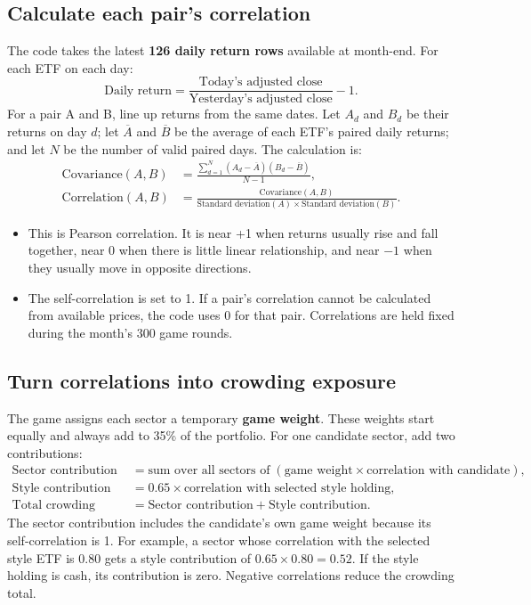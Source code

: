 \documentclass[11pt,letterpaper]{article}
\newcommand{\topic}[1]{\Needspace{5\baselineskip}\subsection*{#1}}
\newcommand{\word}[1]{\text{#1}}
\begin{document}
\topic{Calculate each pair's correlation}
The code takes the latest \textbf{126 daily return rows} available at month-end. For each ETF on each day:
\[
\word{Daily return}=\frac{\word{Today's adjusted close}}{\word{Yesterday's adjusted close}}-1.
\]
For a pair A and B, line up returns from the same dates. Let $A_d$ and $B_d$ be their returns on day $d$; let $\overline A$ and $\overline B$ be the average of each ETF's paired daily returns; and let $N$ be the number of valid paired days. The calculation is:
\[
\begin{aligned}
\word{Covariance}(A,B)&=\frac{\sum_{d=1}^{N}(A_d-\overline A)(B_d-\overline B)}{N-1},\\[4pt]
\word{Correlation}(A,B)&=\frac{\word{Covariance}(A,B)}
{\word{Standard deviation}(A)\times\word{Standard deviation}(B)}.
\end{aligned}
\]
\begin{itemize}
\item This is Pearson correlation. It is near +1 when returns usually rise and fall together, near 0 when there is little linear relationship, and near $-1$ when they usually move in opposite directions.
\item The self-correlation is set to 1. If a pair's correlation cannot be calculated from available prices, the code uses 0 for that pair. Correlations are held fixed during the month's 300 game rounds.
\end{itemize}

\topic{Turn correlations into crowding exposure}
The game assigns each sector a temporary \textbf{game weight}. These weights start equally and always add to 35\% of the portfolio. For one candidate sector, add two contributions:
\[
\begin{aligned}
\word{Sector contribution}&=\word{sum over all sectors of}\;(
\word{game weight}\times\word{correlation with candidate}),\\
\word{Style contribution}&=0.65\times\word{correlation with selected style holding},\\
\word{Total crowding exposure}&=\word{Sector contribution}+\word{Style contribution}.
\end{aligned}
\]
The sector contribution includes the candidate's own game weight because its self-correlation is 1. For example, a sector whose correlation with the selected style ETF is 0.80 gets a style contribution of $0.65\times0.80=0.52$. If the style holding is cash, its contribution is zero. Negative correlations reduce the crowding total.
\end{document}

